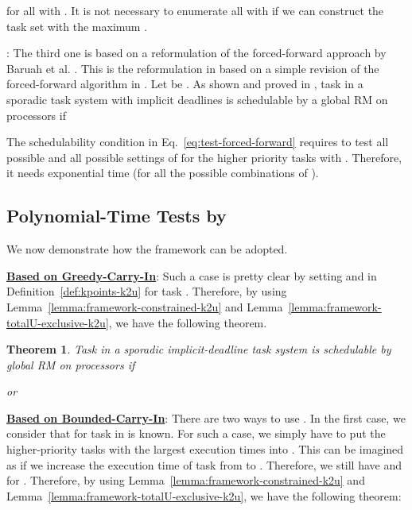 \documentclass[10pt,conference]{IEEEtran}
\newcommand{\frameworkku}[1]{}
\newtheorem{theorem}{Theorem}
\begin{document}
for all  with . It is
not necessary to enumerate all  with  if
 we can construct the task set 
with the maximum .


: The third one is based on a
reformulation of the forced-forward approach by Baruah et
al. \cite{DBLP:journals/rts/BaruahBMS10}. This is the reformulation in
\cite{DBLP:journals/corr/abs-kRTA} based on a simple revision of the
forced-forward algorithm in \cite{DBLP:journals/rts/BaruahBMS10}.  Let  be
.  As shown and proved in
\cite{DBLP:journals/corr/abs-kRTA}, task  in a
sporadic task system with implicit deadlines is schedulable by a
global RM on
 processors if



The schedulability condition in
Eq.~\eqref{eq:test-forced-forward} requires to test all possible  and all possible settings of  for
the higher priority tasks  with .
Therefore, it needs exponential time (for all the possible
combinations of ).

\subsection{Polynomial-Time Tests by \frameworkku{}}

We now demonstrate how the \frameworkku{} framework can be adopted.

\noindent\underline{\bf Based on Greedy-Carry-In}: 
Such a case is pretty clear by setting 
and  in Definition~\ref{def:kpoints-k2u}
for task . Therefore, by using
Lemma~\ref{lemma:framework-constrained-k2u} and
Lemma~\ref{lemma:framework-totalU-exclusive-k2u}, we have the
following theorem.

\begin{theorem}
\label{thm:multiprocessor-GRM}
Task  in a sporadic implicit-deadline task system is
schedulable by global RM on  processors if

or

\end{theorem}

\noindent\underline{\bf Based on Bounded-Carry-In}: There are two ways
to use \frameworkku{}. In the first case, we consider that  for
task  in  is known. For such a case, we simply
have to put the  higher-priority tasks with the largest execution
times into . This can be imagined as if we increase the
execution time of task  from  to . Therefore, we still have  and  for
. Therefore, by using
Lemma~\ref{lemma:framework-constrained-k2u} and
Lemma~\ref{lemma:framework-totalU-exclusive-k2u}, we have the
following theorem:
\end{document}
